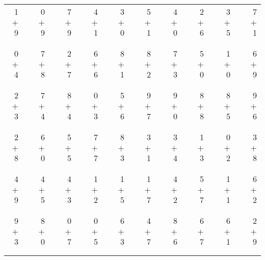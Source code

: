 \documentclass[12pt, letterpaper]{article}
\begin{document}
\begin{tabular}{rrrrrrrrrrrrrrrrrrr}
1 & & 0 & & 7 & & 4 & & 3 & & 5 & & 4 & & 2 & & 3 & & 7\\
$+$ 9 & & $+$ 9 & & $+$ 9 & & $+$ 1 & & $+$ 0 & & $+$ 1 & & $+$ 0 & & $+$ 6 & & $+$ 5 & & $+$ 1\\
\cline{1-1} \cline{3-3} \cline{5-5} \cline{7-7} \cline{9-9} \cline{11-11} \cline{13-13} \cline{15-15} \cline{17-17} \cline{19-19} \\ \\
0 & & 7 & & 2 & & 6 & & 8 & & 8 & & 7 & & 5 & & 1 & & 6\\
$+$ 4 & & $+$ 8 & & $+$ 7 & & $+$ 6 & & $+$ 1 & & $+$ 2 & & $+$ 3 & & $+$ 0 & & $+$ 0 & & $+$ 9\\
\cline{1-1} \cline{3-3} \cline{5-5} \cline{7-7} \cline{9-9} \cline{11-11} \cline{13-13} \cline{15-15} \cline{17-17} \cline{19-19} \\ \\
2 & & 7 & & 8 & & 0 & & 5 & & 9 & & 9 & & 8 & & 8 & & 9\\
$+$ 3 & & $+$ 4 & & $+$ 4 & & $+$ 3 & & $+$ 6 & & $+$ 7 & & $+$ 0 & & $+$ 8 & & $+$ 5 & & $+$ 6\\
\cline{1-1} \cline{3-3} \cline{5-5} \cline{7-7} \cline{9-9} \cline{11-11} \cline{13-13} \cline{15-15} \cline{17-17} \cline{19-19} \\ \\
2 & & 6 & & 5 & & 7 & & 8 & & 3 & & 3 & & 1 & & 0 & & 3\\
$+$ 8 & & $+$ 0 & & $+$ 5 & & $+$ 7 & & $+$ 3 & & $+$ 1 & & $+$ 4 & & $+$ 3 & & $+$ 2 & & $+$ 8\\
\cline{1-1} \cline{3-3} \cline{5-5} \cline{7-7} \cline{9-9} \cline{11-11} \cline{13-13} \cline{15-15} \cline{17-17} \cline{19-19} \\ \\
4 & & 4 & & 4 & & 1 & & 1 & & 1 & & 4 & & 5 & & 1 & & 6\\
$+$ 9 & & $+$ 5 & & $+$ 3 & & $+$ 2 & & $+$ 5 & & $+$ 7 & & $+$ 2 & & $+$ 7 & & $+$ 1 & & $+$ 2\\
\cline{1-1} \cline{3-3} \cline{5-5} \cline{7-7} \cline{9-9} \cline{11-11} \cline{13-13} \cline{15-15} \cline{17-17} \cline{19-19} \\ \\
9 & & 8 & & 0 & & 0 & & 6 & & 4 & & 8 & & 6 & & 6 & & 2\\
$+$ 3 & & $+$ 0 & & $+$ 7 & & $+$ 5 & & $+$ 3 & & $+$ 7 & & $+$ 6 & & $+$ 7 & & $+$ 1 & & $+$ 9\\
\cline{1-1} \cline{3-3} \cline{5-5} \cline{7-7} \cline{9-9} \cline{11-11} \cline{13-13} \cline{15-15} \cline{17-17} \cline{19-19} \\ \\

\end{tabular}
\end{document}
